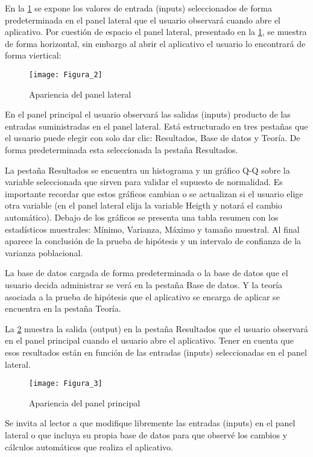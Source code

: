 \documentclass[]{comunicaciones}
\begin{document}
En la \ref{figura2} se expone los valores de entrada (inputs) seleccionados de forma predeterminada en el panel lateral que el usuario observará cuando abre el aplicativo. Por cuestión de espacio el panel lateral, presentado en la \ref{figura2}, se muestra de forma horizontal, sin embargo al abrir el aplicativo el usuario lo encontrará de forma viertical:

\begin{figure}[h]
  \centering
  \texttt{[image: Figura\_2]}
  \caption{Apariencia del panel lateral}
  \label{figura2}
\end{figure}

En el panel principal el usuario observará las salidas (inputs) producto de las entradas suministradas en el panel lateral. Está estructurado en tres pestañas que el usuario puede elegir con solo dar clic: Resultados, Base de datos y Teoría. De forma predeterminada esta seleccionada la pestaña Resultados.

La pestaña Resultados se encuentra un histograma y un gráfico Q-Q sobre la variable seleccionada que sirven para validar el supuesto de normalidad. Es importante recordar que estos gráficos cambian o se actualizan si el usuario elige otra variable (en el panel lateral elija la variable Heigth y notará el cambio automático). Debajo de los gráficos se presenta una tabla resumen con los estadísticos muestrales: Mínimo, Varianza, Máximo y tamaño muestral. Al final aparece la conclusión de la prueba de hipótesis y un intervalo de confianza de la varianza poblacional.

La base de datos cargada de forma predeterminada o la base de datos que el usuario decida administrar se verá en la pestaña Base de datos. Y la teoría asociada a la prueba de hipótesis que el aplicativo se encarga de aplicar se encuentra en la pestaña Teoría.

La \ref{figura3} muestra la salida (output) en la pestaña Resultados que el usuario observará en el panel principal cuando el usuario abre el aplicativo. Tener en cuenta que esos resultados están en función de las entradas (inputs) seleccionadas en el panel lateral.

\begin{figure}[h]
  \centering
  \texttt{[image: Figura\_3]}
  \caption{Apariencia del panel principal}
  \label{figura3}
\end{figure}

Se invita al lector a que modifique libremente las entradas (inputs) en el panel lateral o que incluya su propia base de datos para que observé los cambios y cálculos automáticos que realiza el aplicativo.
\end{document}
